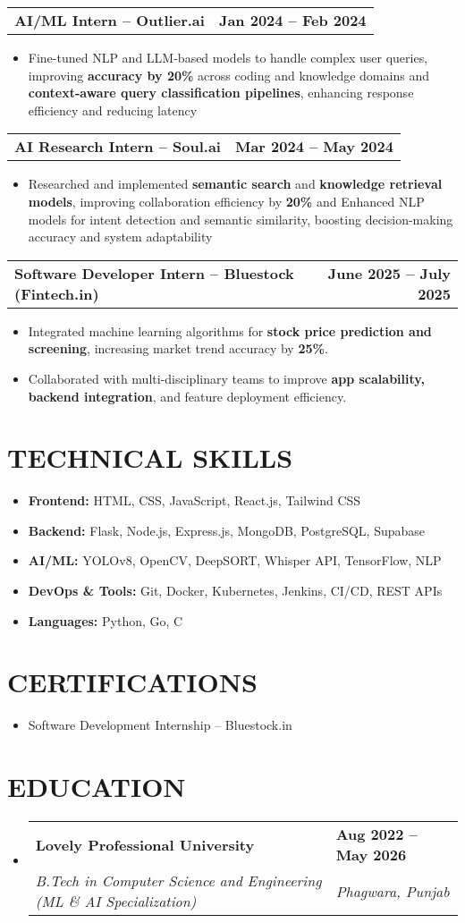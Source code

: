 \documentclass[letterpaper,11pt]{article}
\makeatletter
\newcommand{\resumeItem}[1]{\item[$\bullet$] \small{#1 \vspace{-2pt}}}
\newcommand{\resumeSubheading}[4]{
  \item
  \begin{tabularx}{\textwidth}[t]{Xs}
    \textbf{#1} & \textbf{#2} \\
    \textit{#3} & \textit{#4} \\
  \end{tabularx}\vspace{10pt}
}
\newcommand{\resumeProjectHeading}[2]{
  \item
  \begin{tabular*}{1.0\textwidth}{l@{\extracolsep{\fill}}r}
    \textbf{#1} & \textbf{#2} \\
  \end{tabular*}\vspace{-8pt}
}
\newcommand{\resumeItemListStart}{\begin{itemize}[leftmargin=0.15in, label={}]\setlength\itemsep{3pt}}
\newcommand{\resumeItemListEnd}{\end{itemize}\vspace{-8pt}}
\makeatother
\begin{document}
\resumeProjectHeading
  {\textbf{AI/ML Intern – Outlier.ai}}
  {Jan 2024 -- Feb 2024}
\resumeItemListStart
  \resumeItem{Fine-tuned NLP and LLM-based models to handle complex user queries, improving \textbf{accuracy by 20\%} across coding and knowledge domains and \textbf{context-aware query classification pipelines}, enhancing response efficiency and reducing latency}
\resumeItemListEnd

\resumeProjectHeading
  {\textbf{AI Research Intern – Soul.ai}}
  {Mar 2024 -- May 2024}
\resumeItemListStart
  \resumeItem{Researched and implemented \textbf{semantic search} and \textbf{knowledge retrieval models}, improving collaboration efficiency by \textbf{20\%} and Enhanced NLP models for intent detection and semantic similarity, boosting decision-making accuracy and system adaptability}
\resumeItemListEnd

\resumeProjectHeading
  {\textbf{Software Developer Intern – Bluestock (Fintech.in)}}
  {June 2025 -- July 2025}
\resumeItemListStart
\resumeItem{Integrated machine learning algorithms for \textbf{stock price prediction and screening}, increasing market trend accuracy by \textbf{25\%}.}
\resumeItem{Collaborated with multi-disciplinary teams to improve \textbf{app scalability, backend integration}, and feature deployment efficiency.}
\resumeItemListEnd

\section{TECHNICAL SKILLS}
\resumeItemListStart
\resumeItem{\textbf{Frontend:} HTML, CSS, JavaScript, React.js, Tailwind CSS}
\resumeItem{\textbf{Backend:} Flask, Node.js, Express.js, MongoDB, PostgreSQL, Supabase}
\resumeItem{\textbf{AI/ML:} YOLOv8, OpenCV, DeepSORT, Whisper API, TensorFlow, NLP}
\resumeItem{\textbf{DevOps \& Tools:} Git, Docker, Kubernetes, Jenkins, CI/CD, REST APIs}
\resumeItem{\textbf{Languages:} Python, Go, C}
\resumeItemListEnd

\section{CERTIFICATIONS}
\resumeItemListStart
\resumeItem{Software Development Internship – Bluestock.in}
\resumeItemListEnd

\section{EDUCATION}
\resumeItemListStart
    \begin{itemize}[topmargin=1,leftmargin=-0.17in, label={}]
        \resumeSubheading
          {Lovely Professional University}{Aug 2022 -- May 2026}
          {B.Tech in Computer Science and Engineering (ML \& AI Specialization)}{Phagwara, Punjab}
    \end{itemize}
\resumeItemListEnd
\end{document}
